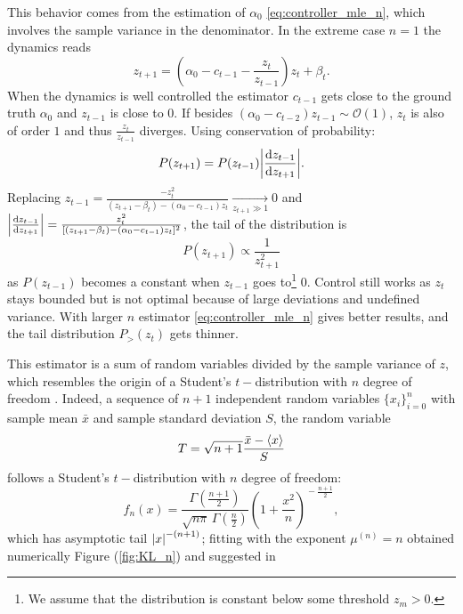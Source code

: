 \documentclass[FinalReport.tex]{subfiles}
\begin{document}
This behavior comes from the estimation of $\alpha_0$ \eqref{eq:controller_mle_n}, which involves the sample variance in the denominator. In the extreme case $n=1$ the dynamics reads
\begin{equation}\label{eq:dyn_n=1}
	z_{t+1}=\left(\alpha_0-c_{t-1}-\frac{z_t}{z_{t-1}} \right)z_t + \beta_t.	
\end{equation}
When the dynamics is well controlled the estimator $c_{t-1}$ gets close to the ground truth $\alpha_0$ and $z_{t-1}$ is close to $0$. If besides $(\alpha_0-c_{t-2})z_{t-1}\sim\mathcal{O}(1)$, $z_t$ is also of order $1$ and thus $\frac{z_t}{z_{t-1}}$ diverges.
Using conservation of probability:
\begin{equation}
	P(z_{t+1})=P(z_{t-1})\abs{\frac{\dd{z_{t-1}}}{\dd{z_{t+1}}} }.
\end{equation}
Replacing $z_{t-1}=\frac{-z_t^2}{(z_{t+1}-\beta_t)-(\alpha_0-c_{t-1})z_t}\underset{z_{t+1}\gg1}{\longrightarrow}0$ and $\abs{\frac{\dd{z_{t-1}}}{\dd{z_{t+1}}} }=\frac{z_t^2}{[(z_{t+1}-\beta_t)-(\alpha_0-c_{t-1})z_t]^2}$, the tail of the distribution is
\begin{equation}\label{eq:tail_p(z)_n=1}
	P(z_{t+1})\propto \frac{1}{z_{t+1}^{2}}
\end{equation}
as $P(z_{t-1})$ becomes a constant when $z_{t-1}$ goes to\footnote{We assume that the distribution is constant below some threshold $z_m>0$.} $0$.
Control still works as $z_t$ stays bounded but is not optimal because of large deviations and undefined variance.
With larger $n$ estimator \eqref{eq:controller_mle_n} gives better results, and the tail distribution $P_>(z_t)$ gets thinner. 

This estimator is a sum of random variables divided by the sample variance of $z$, which resembles the origin of a Student's $t-$distribution with $n$ degree of freedom \cite[chap.~14]{CritPhenom}. Indeed, a sequence of $n+1$ independent random variables $\{x_i\}_{i=0}^n$ with sample mean $\bar{x}$ and sample standard deviation $S$, the random variable
\begin{equation}
	T = \sqrt{n+1}\frac{\bar{x}-\expval{x}}{{S}}
\end{equation}
follows a Student's $t-$distribution with $n$ degree of freedom:
\begin{equation}
	f_n(x) = \frac{\Gamma(\frac{n+1}{2})} {\sqrt{n\pi}\,\Gamma(\frac{n}{2})} \left(1+\frac{x^2}{n} \right)^{\!-\frac{n+1}{2}},
\end{equation}
which has asymptotic tail $\abs{x}^{-(n+1)}$; fitting with the exponent $\mu^{(n)}=n$ obtained numerically Figure (\ref{fig:KL_n}) and suggested in \cite{OptCont}
\end{document}
